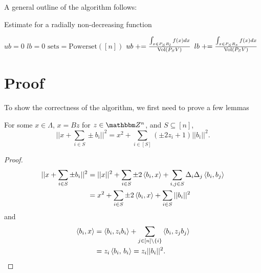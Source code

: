 \documentclass[12pt]{article}
\begin{document}
A general outline of the algorithm follows:
\begin{algorithm}
	\caption{Estimate for a radially non-decreasing function}
	\begin{algorithmic}[1]
		\State $ub = 0$
		\State $lb = 0$
		\State $\mathrm{sets} = \mathrm{Powerset}([n])$
			\State $ub \mathrel{+}= \frac{ 
					\int_{x \in P_S R_l} f(x) dx
				}{
					\mathrm{Vol}(P_S V)
				}$
			\State $lb \mathrel{+}= \frac{ 
					\int_{x \in P_S R_s} f(x) dx
				}{
					\mathrm{Vol}(P_S V)
				}$
		\EndFor
		\item {}
		
	\end{algorithmic}
\end{algorithm}

\section*{Proof}
To show the correctness of the algorithm, we first need to prove a few lemmas

\begin{lemma}
	\label{lemma:lin-alg}
	For some $x \in \Lambda$, $x = Bz$ for $z \in \Z^n$, and $S \subseteq [n]$, 
	$$||x + \sum_{i \in S} \pm b_i||^2 = x^2 + \sum_{i \in [S]} (\pm 2 z_i + 1)||b_i||^2.$$
	\begin{proof}
		\begin{align*}
		||x + \sum_{i \in S} \pm b_i||^2 &= ||x||^2 + \sum_{i \in S} \pm 2 \braket{b_i,  x} + \sum_{i, j \in S}\Delta_i \Delta_j \braket{b_i,  b_j} \\
		&= x^2 + \sum_{i \in S} \pm 2 \braket{b_i,  x} + \sum_{i \in S} ||b_i||^2
		\end{align*}
		and
		\begin{align*}
			\braket{b_i, x} &= \braket{ b_i,  z_i b_i } + \sum_{j \in [n] \setminus \{i\}} \braket{ b_i,  z_j b_j } \\
			&= z_i \braket{ b_i,\, b_i } = z_i ||b_i||^2.
		\end{align*}
	\end{proof}
\end{lemma}
\end{document}
